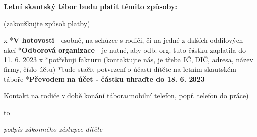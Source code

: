 \noindent
\medskip
\parindent=1pt

{\bf Letní skautský tábor budu platit těmito způsoby:}
\parindent=0cm

(zakoužkujte způsob platby)

\begitems \style x
*{\bf V hotovosti} - osobně, na schůzce s rodiči, či na jedné z dalších oddílových akcí
*{\bf Odborová organizace} -  je nutné, aby odb. org. tuto částku zaplatila do 11. 6. 2023
\begitems \style x
*potřebuji fakturu (kontaktujte nás, je třeba IČ, DIČ, adresa, název firmy, číslo účtu)
*bude stačit potvrzení o účasti dítěte na letním skautském táboře
\enditems
*{\bf Převodem na účet - částku uhraďte do 18. 6. 2023}
\enditems

\medskip
Kontakt na rodiče v době konání tábora(mobilní telefon, popř. telefon do práce)
\vskip 2cm

\hbox to 

{\hfill\it\typosize[7/13]podpis zákonného zástupce dítěte}
\bye
